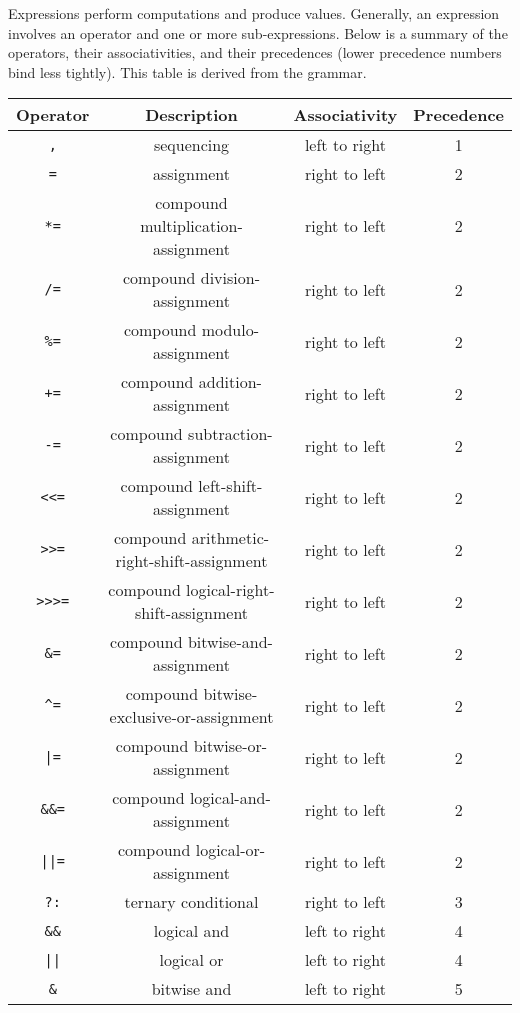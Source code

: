 \documentclass[letterpaper,12pt]{book}
\begin{document}
Expressions perform computations and produce values. Generally, an expression involves an operator and one or more sub-expressions. Below is a summary of the operators, their associativities, and their precedences (lower precedence numbers bind less tightly). This table is derived from the grammar.

\begin{longtable}{|c|c|c|c|}
\hline
\textbf{Operator} & \textbf{Description} & \textbf{Associativity} & \textbf{Precedence}\\
\hline
\texttt{,} & sequencing & left to right & 1\\
\hline
\texttt{=} & assignment & right to left & 2\\
\hline
\texttt{*=} & compound multiplication-assignment & right to left & 2\\
\hline
\texttt{/=} & compound division-assignment & right to left & 2\\
\hline
\texttt{\%=} & compound modulo-assignment & right to left & 2\\
\hline
\texttt{+=} & compound addition-assignment & right to left & 2\\
\hline
\texttt{-=} & compound subtraction-assignment & right to left & 2\\
\hline
\texttt{<<=} & compound left-shift-assignment & right to left & 2\\
\hline
\texttt{>>=} & compound arithmetic-right-shift-assignment & right to left & 2\\
\hline
\texttt{>>>=} & compound logical-right-shift-assignment & right to left & 2\\
\hline
\texttt{\&=} & compound bitwise-and-assignment & right to left & 2\\
\hline
\texttt{\^{}=} & compound bitwise-exclusive-or-assignment & right to left & 2\\
\hline
\texttt{|=} & compound bitwise-or-assignment & right to left & 2\\
\hline
\texttt{\&\&=} & compound logical-and-assignment & right to left & 2\\
\hline
\texttt{||=} & compound logical-or-assignment & right to left & 2\\
\hline
\texttt{?:} & ternary conditional & right to left & 3\\
\hline
\texttt{\&\&} & logical and & left to right & 4\\
\hline
\texttt{||} & logical or & left to right & 4\\
\hline
\texttt{\&} & bitwise and & left to right & 5\\

\end{longtable}
\end{document}
